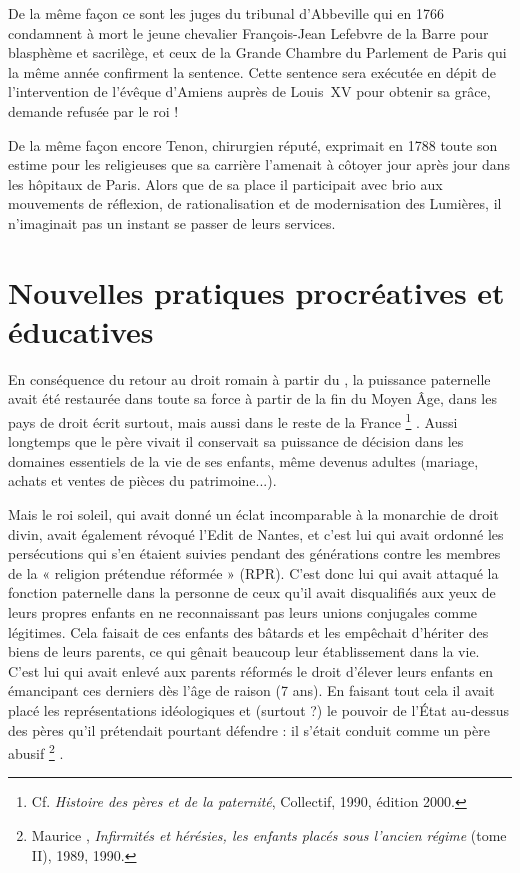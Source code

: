  De la même façon ce sont les juges du tribunal d'Abbeville qui en 1766 condamnent à mort le jeune chevalier François-Jean Lefebvre de la Barre pour blasphème et sacrilège, et ceux de la Grande Chambre du Parlement de Paris qui la même année confirment la sentence. Cette sentence sera exécutée en dépit de l'intervention de l'évêque d'Amiens auprès de Louis~XV pour obtenir sa grâce, demande refusée par le roi !
 
 De la même façon encore Tenon, chirurgien réputé, exprimait en 1788 toute son estime pour les religieuses que sa carrière l'amenait à côtoyer jour après jour dans les hôpitaux de Paris. Alors que de sa place il participait avec brio aux mouvements de réflexion, de rationalisation et de modernisation des Lumières, il n'imaginait pas un instant se passer de leurs services. 


\section{Nouvelles pratiques procréatives et éducatives}

 En conséquence du retour au droit romain à partir du , la puissance paternelle avait été restaurée dans toute sa force à partir de la fin du Moyen Âge, dans les pays de droit écrit surtout, mais aussi dans le reste de la France%
\footnote{Cf. \emph{Histoire des pères et de la paternité}, Collectif, 1990, édition 2000.}%
. Aussi longtemps que le père vivait il conservait sa puissance de décision dans les domaines essentiels de la vie de ses enfants, même devenus adultes (mariage, achats et ventes de pièces du patrimoine...). 

 Mais le roi soleil, qui avait donné un éclat incomparable à la monarchie de droit divin, avait également révoqué l'Edit de Nantes, et c'est lui qui avait ordonné les persécutions qui s'en étaient suivies pendant des générations contre les membres de la « {religion prétendue réformée} » (RPR). C'est donc lui qui avait attaqué la fonction paternelle dans la personne de ceux qu'il avait disqualifiés aux yeux de leurs propres enfants en ne reconnaissant pas leurs unions conjugales comme légitimes. Cela faisait de ces enfants des bâtards et les empêchait d'hériter des biens de leurs parents, ce qui gênait beaucoup leur établissement dans la vie. C'est lui qui avait enlevé aux parents réformés le droit d'élever leurs enfants en émancipant ces derniers dès l'âge de raison (7 ans). En faisant tout cela il avait placé les représentations idéologiques et (surtout ?) le pouvoir de l'État au-dessus des pères qu'il prétendait pourtant défendre : il s'était conduit comme un père abusif%
\footnote{Maurice , \emph{Infirmités et hérésies, les enfants placés sous l'ancien régime} (tome II), 1989, 1990.}%
.


